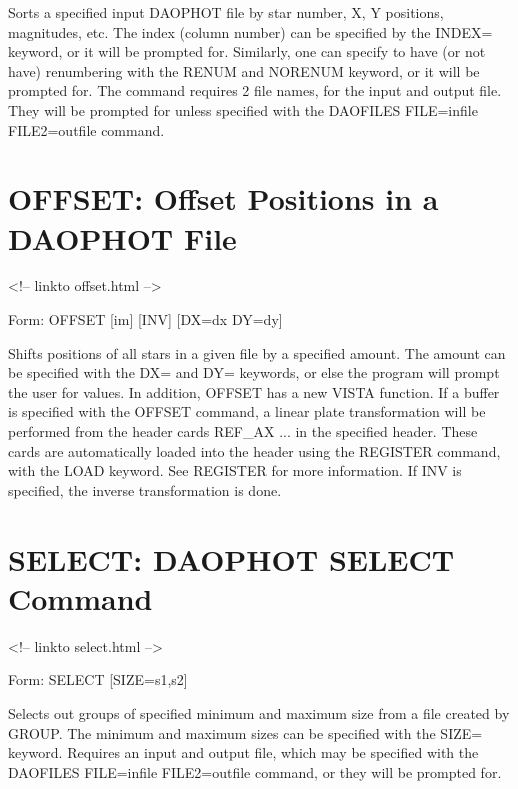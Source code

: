 Sorts a specified input DAOPHOT file by star number, X, Y positions,
magnitudes, etc. The index (column number) can be specified by the INDEX=
keyword, or it will be prompted for. Similarly, one can specify to have
(or not have) renumbering with the RENUM and NORENUM keyword, or it
will be prompted for. The command requires 2 file names, for the input
and output file.  They will be prompted for unless specified with the
DAOFILES FILE=infile FILE2=outfile command.

\section{OFFSET: Offset Positions in a DAOPHOT File}
\begin{rawhtml}
<!-- linkto offset.html -->
\end{rawhtml}
\begin{command}
  \item[Form: OFFSET {[im]} {[INV]} {[DX=dx DY=dy]}\hfill]{}
\end{command}

Shifts positions of all stars in a given file by a specified amount. The
amount can be specified with the DX= and DY= keywords, or else the program
will prompt the user for values. In addition, OFFSET has a new VISTA
function. If a buffer is specified with the OFFSET command, a linear plate
transformation will be performed from the header cards REF\_AX ... in the
specified header. These cards are automatically loaded into the header
using the REGISTER command, with the LOAD keyword. See REGISTER for more
information.  If INV is specified, the inverse transformation is done.

\section{SELECT: DAOPHOT SELECT Command}
\begin{rawhtml}
<!-- linkto select.html -->
\end{rawhtml}
\begin{command}
  \item[Form: SELECT {[SIZE=s1,s2]}\hfill]{}
\end{command}

Selects out groups of specified minimum and maximum size from a file
created by GROUP. The minimum and maximum sizes can be specified with the
SIZE= keyword. Requires an input and output file, which may be specified
with the DAOFILES FILE=infile FILE2=outfile command, or they will be
prompted for.

